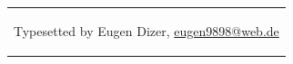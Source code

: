 \begin{center}
\begin{tabular}{p{\textwidth}}
\vspace*{2cm}

\begin{center}
Typesetted by Eugen Dizer, \url{eugen9898@web.de}
\end{center}


\end{tabular}
\end{center}